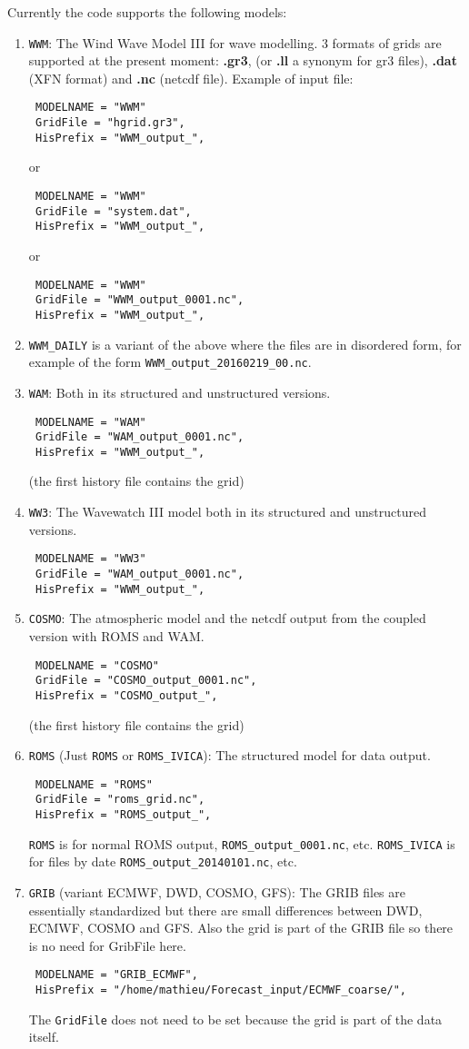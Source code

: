 \documentclass[12pt]{amsart}
\begin{document}
Currently the code supports the following models:
\begin{enumerate}
\item {\tt WWM}: The Wind Wave Model III for wave modelling. 3 formats of grids are supported at the present moment: {\bf .gr3}, (or {\bf .ll} a synonym for gr3 files), {\bf .dat} (XFN format) and {\bf .nc} (netcdf file).
Example of input file:
\begin{verbatim}
 MODELNAME = "WWM"
 GridFile = "hgrid.gr3",
 HisPrefix = "WWM_output_",
\end{verbatim}
or 
\begin{verbatim}
 MODELNAME = "WWM"
 GridFile = "system.dat",
 HisPrefix = "WWM_output_",
\end{verbatim}
or
\begin{verbatim}
 MODELNAME = "WWM"
 GridFile = "WWM_output_0001.nc",
 HisPrefix = "WWM_output_",
\end{verbatim}
\item {\tt WWM\_DAILY} is a variant of the above where the files are in disordered form, for example of the form {\tt WWM\_output\_20160219\_00.nc}.
\item {\tt WAM}: Both in its structured and unstructured versions.
\begin{verbatim}
 MODELNAME = "WAM"
 GridFile = "WAM_output_0001.nc",
 HisPrefix = "WWM_output_",
\end{verbatim}
(the first history file contains the grid)
\item {\tt WW3}: The Wavewatch III model both in its structured and unstructured versions.
\begin{verbatim}
 MODELNAME = "WW3"
 GridFile = "WAM_output_0001.nc",
 HisPrefix = "WWM_output_",
\end{verbatim}
\item {\tt COSMO}: The atmospheric model and the netcdf output from the coupled version with ROMS and WAM.
\begin{verbatim}
 MODELNAME = "COSMO"
 GridFile = "COSMO_output_0001.nc",
 HisPrefix = "COSMO_output_",
\end{verbatim}
(the first history file contains the grid)
\item {\tt ROMS} (Just {\tt ROMS} or {\tt ROMS\_IVICA}): The structured model for data output.
\begin{verbatim}
 MODELNAME = "ROMS"
 GridFile = "roms_grid.nc",
 HisPrefix = "ROMS_output_",
\end{verbatim}
{\tt ROMS} is for normal ROMS output, {\tt ROMS\_output\_0001.nc}, etc. {\tt ROMS\_IVICA} is for files by date {\tt ROMS\_output\_20140101.nc}, etc.
\item {\tt GRIB} (variant ECMWF, DWD, COSMO, GFS): The GRIB files are essentially standardized but there are small differences between DWD, ECMWF, COSMO and GFS. Also the grid is part of the GRIB file so there is no need for GribFile here.
\begin{verbatim}
 MODELNAME = "GRIB_ECMWF", 
 HisPrefix = "/home/mathieu/Forecast_input/ECMWF_coarse/", 
\end{verbatim}
The {\tt GridFile} does not need to be set because the grid is part of the data itself.
\end{enumerate}
\end{document}
